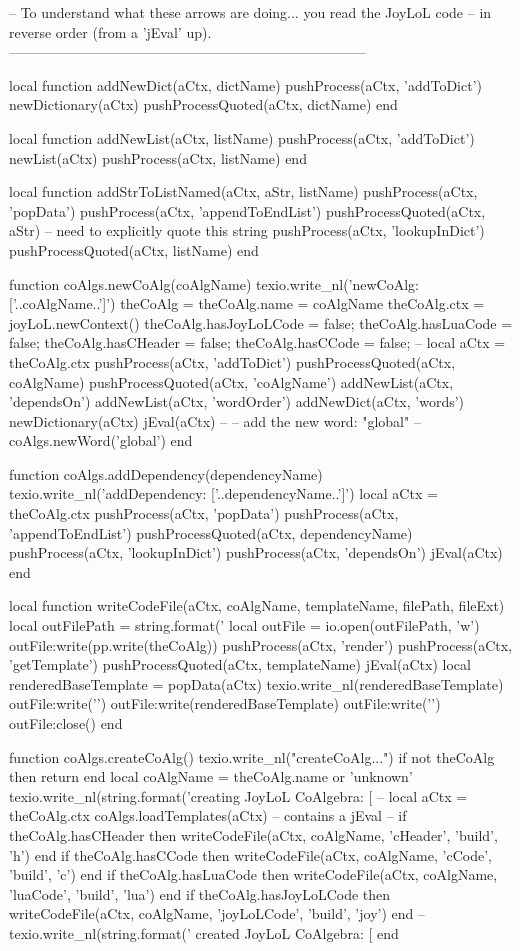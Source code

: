 -- To understand what these arrows are doing... you read the JoyLoL code 
-- in reverse order (from a 'jEval' up). 
-----------------------------------------------------------------------------

local function addNewDict(aCtx, dictName)
  pushProcess(aCtx, 'addToDict')
  newDictionary(aCtx)
  pushProcessQuoted(aCtx, dictName)
end

local function addNewList(aCtx, listName)
  pushProcess(aCtx, 'addToDict')
  newList(aCtx)
  pushProcess(aCtx, listName)
end

local function addStrToListNamed(aCtx, aStr, listName)
  pushProcess(aCtx, 'popData')
  pushProcess(aCtx, 'appendToEndList')
  pushProcessQuoted(aCtx, aStr) -- need to explicitly quote this string
  pushProcess(aCtx, 'lookupInDict')
  pushProcessQuoted(aCtx, listName)
end

function coAlgs.newCoAlg(coAlgName)
  texio.write_nl('newCoAlg: ['..coAlgName..']')
  theCoAlg               = {}
  theCoAlg.name          = coAlgName
  theCoAlg.ctx           = joyLoL.newContext()
  theCoAlg.hasJoyLoLCode = false;
  theCoAlg.hasLuaCode    = false;
  theCoAlg.hasCHeader    = false;
  theCoAlg.hasCCode      = false;
  -- 
  local aCtx = theCoAlg.ctx
  pushProcess(aCtx, 'addToDict')
  pushProcessQuoted(aCtx, coAlgName)
  pushProcessQuoted(aCtx, 'coAlgName')
  addNewList(aCtx, 'dependsOn')
  addNewList(aCtx, 'wordOrder')
  addNewDict(aCtx, 'words')
  newDictionary(aCtx)
  jEval(aCtx)
  --
  -- add the new word: "global"
  --
  coAlgs.newWord('global')
end

function coAlgs.addDependency(dependencyName)
  texio.write_nl('addDependency: ['..dependencyName..']')
  local aCtx = theCoAlg.ctx
  pushProcess(aCtx, 'popData')
  pushProcess(aCtx, 'appendToEndList')
  pushProcessQuoted(aCtx, dependencyName)
  pushProcess(aCtx, 'lookupInDict')
  pushProcess(aCtx, 'dependsOn')
  jEval(aCtx)
end

local function writeCodeFile(aCtx, coAlgName, templateName, filePath, fileExt)
  local outFilePath = string.format('%
  local outFile = io.open(outFilePath, 'w')
  outFile:write(pp.write(theCoAlg))
  pushProcess(aCtx, 'render')
  pushProcess(aCtx, 'getTemplate')
  pushProcessQuoted(aCtx, templateName)
  jEval(aCtx)
  local renderedBaseTemplate = popData(aCtx)
  texio.write_nl(renderedBaseTemplate)
  outFile:write('\n')
  outFile:write(renderedBaseTemplate)
  outFile:write('\n')
  outFile:close()
end

function coAlgs.createCoAlg()
  texio.write_nl("createCoAlg...")
  if not theCoAlg then return end
  local coAlgName = theCoAlg.name or 'unknown'
  texio.write_nl(string.format('creating JoyLoL CoAlgebra: [%
  --
  local aCtx = theCoAlg.ctx
  coAlgs.loadTemplates(aCtx) -- contains a jEval
  --
  if theCoAlg.hasCHeader    then writeCodeFile(aCtx, coAlgName, 'cHeader',    'build', 'h')   end
  if theCoAlg.hasCCode      then writeCodeFile(aCtx, coAlgName, 'cCode',      'build', 'c')   end
  if theCoAlg.hasLuaCode    then writeCodeFile(aCtx, coAlgName, 'luaCode',    'build', 'lua') end
  if theCoAlg.hasJoyLoLCode then writeCodeFile(aCtx, coAlgName, 'joyLoLCode', 'build', 'joy') end
  --
  texio.write_nl(string.format(' created JoyLoL CoAlgebra: [%
end

